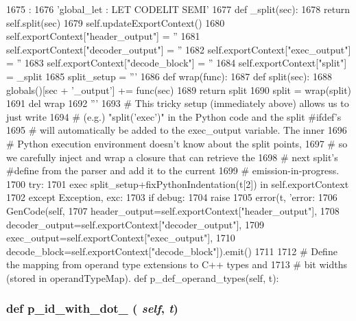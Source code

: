 \begin{DoxyCode}
1675                              :
1676         'global_let : LET CODELIT SEMI'
1677         def _split(sec):
1678             return self.split(sec)
1679         self.updateExportContext()
1680         self.exportContext["header_output"] = ''
1681         self.exportContext["decoder_output"] = ''
1682         self.exportContext["exec_output"] = ''
1683         self.exportContext["decode_block"] = ''
1684         self.exportContext["split"] = _split
1685         split_setup = '''
1686 def wrap(func):
1687     def split(sec):
1688         globals()[sec + '_output'] += func(sec)
1689     return split
1690 split = wrap(split)
1691 del wrap
1692 '''
1693         # This tricky setup (immediately above) allows us to just write
1694         # (e.g.) "split('exec')" in the Python code and the split #ifdef's
1695         # will automatically be added to the exec_output variable. The inner
1696         # Python execution environment doesn't know about the split points,
1697         # so we carefully inject and wrap a closure that can retrieve the
1698         # next split's #define from the parser and add it to the current
1699         # emission-in-progress.
1700         try:
1701             exec split_setup+fixPythonIndentation(t[2]) in self.exportContext
1702         except Exception, exc:
1703             if debug:
1704                 raise
1705             error(t, 'error: %
1706         GenCode(self,
1707                 header_output=self.exportContext["header_output"],
1708                 decoder_output=self.exportContext["decoder_output"],
1709                 exec_output=self.exportContext["exec_output"],
1710                 decode_block=self.exportContext["decode_block"]).emit()
1711 
1712     # Define the mapping from operand type extensions to C++ types and
1713     # bit widths (stored in operandTypeMap).
    def p_def_operand_types(self, t):
\end{DoxyCode}
\hypertarget{classisa__parser_1_1ISAParser_afb4323ab4dbe951856c57df317316421}{
\subsubsection[{p\_\-id\_\-with\_\-dot\_\-0}]{\setlength{\rightskip}{0pt plus 5cm}def p\_\-id\_\-with\_\-dot\_ ( {\em self}, \/   {\em t})}}
\label{classisa__parser_1_1ISAParser_afb4323ab4dbe951856c57df317316421}



